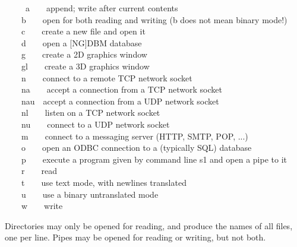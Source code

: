 \ \ \ \ \ \textsf{{\textquotedbl}a{\textquotedbl}\ \ \ \ }append; write
after current contents\\
 \ \ \ \ \textsf{{\textquotedbl}b{\textquotedbl}\ \ \ \ }open for both
reading and writing (b does not mean binary mode!)\\
 \ \ \ \ \textsf{{\textquotedbl}c{\textquotedbl}\ \ \ \ }create a new
file and open it\\
 \ \ \ \ \textsf{{\textquotedbl}d{\textquotedbl}\ \ \ \ }open a
[NG]DBM database\\
 \ \ \ \ \textsf{{\textquotedbl}g{\textquotedbl}\ \ \ \ }create a 2D
graphics window\\
 \ \ \ \ \textsf{{\textquotedbl}gl{\textquotedbl}\ \ \ \ }create a 3D
graphics window\\
 \ \ \ \ \textsf{{\textquotedbl}n{\textquotedbl}\ \ \ \ }connect to a
remote TCP network socket\\
 \ \ \ \ \textsf{{\textquotedbl}na{\textquotedbl}\ \ \ \ }accept a
connection from a TCP network socket \\
 \ \ \ \ \textsf{{\textquotedbl}nau{\textquotedbl}\ \ }accept a
connection from a UDP network socket\\
 \ \ \ \ \textsf{{\textquotedbl}nl{\textquotedbl}\ \ \ \ }listen on a
TCP network socket \\
 \ \ \ \ \textsf{{\textquotedbl}nu{\textquotedbl}\ \ \ \ }connect to a
UDP network socket\\
 \ \ \ \ \textsf{{\textquotedbl}m{\textquotedbl}\ \ \ \ }connect to a
messaging server (HTTP, SMTP, POP, ...)\\
 \ \ \ \ \textsf{{\textquotedbl}o{\textquotedbl}\ \ \ \ }open an
ODBC connection to a (typically SQL)
database\\
 \ \ \ \ \textsf{{\textquotedbl}p{\textquotedbl}\ \ \ \ }execute a
program given by command line s1 and open a pipe to it\\
 \ \ \ \ \textsf{{\textquotedbl}r{\textquotedbl}\ \ \ \ }read\\
 \ \ \ \ \textsf{{\textquotedbl}t{\textquotedbl}\ \ \ \ }use text mode,
with newlines translated\\
 \ \ \ \ \textsf{{\textquotedbl}u{\textquotedbl}\ \ \ \ }use a binary
untranslated mode\\
 \ \ \ \ \textsf{{\textquotedbl}w{\textquotedbl}\ \ \ \ }write

Directories may only be opened for reading, and produce the names of all
files, one per line. Pipes may be opened for reading or writing, but
not both.

